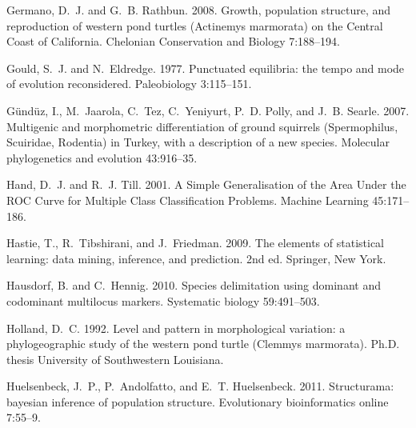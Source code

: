 \documentclass[12pt,letterpaper]{article}
\begin{document}
\begin{thebibliography}{77}
    Germano, D.~J. and G.~B. Rathbun. 2008. {Growth, population structure, and
      reproduction of western pond turtles (Actinemys marmorata) on the Central
    Coast of California}. Chelonian Conservation and Biology 7:188--194.

    Gould, S.~J. and N.~Eldredge. 1977. {Punctuated equilibria: the tempo and mode
    of evolution reconsidered}. Paleobiology 3:115--151.

    G\"{u}nd\"{u}z, I., M.~Jaarola, C.~Tez, C.~Yeniyurt, P.~D. Polly, and J.~B.
    Searle. 2007. {Multigenic and morphometric differentiation of ground
      squirrels (Spermophilus, Scuiridae, Rodentia) in Turkey, with a description
    of a new species.} Molecular phylogenetics and evolution 43:916--35.

    Hand, D.~J. and R.~J. Till. 2001. {A Simple Generalisation of the Area Under
    the ROC Curve for Multiple Class Classification Problems}. Machine Learning
    45:171--186.

    Hastie, T., R.~Tibshirani, and J.~Friedman. 2009. {The elements of statistical
    learning: data mining, inference, and prediction}. 2nd ed. Springer, New
    York.

    Hausdorf, B. and C.~Hennig. 2010. {Species delimitation using dominant and
    codominant multilocus markers.} Systematic biology 59:491--503.

    Holland, D.~C. 1992. {Level and pattern in morphological variation: a
    phylogeographic study of the western pond turtle (Clemmys marmorata)}. Ph.D.
    thesis University of Southwestern Louisiana.

    Huelsenbeck, J.~P., P.~Andolfatto, and E.~T. Huelsenbeck. 2011. {Structurama:
    bayesian inference of population structure.} Evolutionary bioinformatics
    online 7:55--9.


\end{thebibliography}
\end{document}
